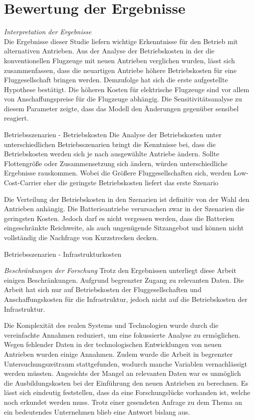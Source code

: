 
\section{Bewertung der Ergebnisse}
\label{s:Bewertung der Ergebnisse}

\textit{Interpretation der Ergebnisse}\\
Die Ergebnisse dieser Studie liefern wichtige Erkenntnisse für den Betrieb mit alternativen Antrieben.
Aus der Analyse der Betriebskosten in der die konventionellen Flugzeuge mit neuen Antrieben verglichen wurden, 
lässt sich zusammenfassen, dass die neuartigen Antriebe höhere Betriebskosten für eine Fluggesellschaft bringen werden.
Demzufolge hat sich die erste aufgestellte Hypothese bestätigt. Die höheren Kosten für elektrische Flugzeuge sind vor allem von Anschaffungspreise für
die Flugzeuge abhängig. Die Sensitivitätsanalyse zu diesem Parameter zeigte, dass das Modell den Änderungen gegenüber sensibel reagiert.



Betriebsszenarien - Betriebskosten
Die Analyse der Betriebskosten unter unterschiedlichen Betriebsszenarien bringt die Kenntnisse bei, dass die Betriebskosten werden sich je nach
ausgewählte Antriebe ändern. Sollte Flottengröße oder Zusammensetzung sich ändern, würden unterschiedliche Ergebnisse rauskommen.
Wobei die Größere Fluggesellschaften sich, werden Low-Cost-Carrier eher
 die geringste Betriebskosten
liefert das erste Szenario

Die Verteilung der Betriebskosten in den Szenarien ist definitiv von der Wahl den Antrieben anhängig. Die Batterieantriebe verursachen zwar
in der Szenarien die geringsten Kosten. Jedoch darf es nicht vergessen werden, dass die Batterien eingeschränkte Reichweite, als auch
ungenügende Sitzangebot und können nicht vollständig die Nachfrage von Kurzstrecken decken.

Betriebsszenarien - Infrastrukturkosten

\textit{Beschränkungen der Forschung}
Trotz den Ergebnissen unterliegt diese Arbeit einigen Beschränkungen. Aufgrund begrenzter Zugang zu relevanten Daten.
Die Arbeit hat sich nur auf Betriebskosten der Fluggesellschaften und Anschaffungskosten für die Infrastruktur,
jedoch nicht auf die Betriebskosten der Infrastruktur.

Die Komplexität des realen Systems und Technologien wurde durch die vereinfachte Annahmen reduziert, um eine fokussierte Analyse zu ermöglichen.
Wegen fehlender Daten in der technologischen Entwicklungen von neuen Antrieben wurden einige Annahmen.
Zudem wurde die Arbeit in begrenzter Untersuchungszeitraum stattgefunden, wodurch manche Variablen vernachlässigt werden müssten.
%
Angesichts der Mangel an relevanten Daten war es unmöglich die Ausbildungskosten bei der Einführung den neuen Antrieben zu berechnen.
Es lässt sich eindeutig feststellen, dass da eine Forschungslücke vorhanden ist, welche noch erkundet werden muss. 
Trotz einer gesendeten Anfrage zu dem Thema an ein bedeutendes Unternehmen blieb eine Antwort bislang aus.

